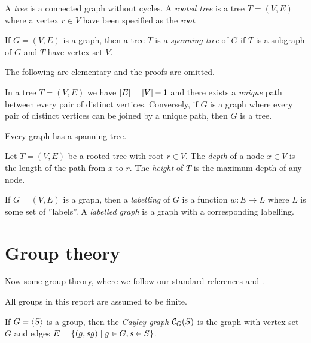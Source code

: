 \begin{deff} \label{def_tree}
A \emph{tree} is a connected graph without cycles. A \emph{rooted tree} is a tree $T = (V, E)$ where a vertex $r \in V$ have been specified as the \emph{root}.
\end{deff}

\begin{deff}
If $G = (V, E)$ is a graph, then a tree $T$ is a \emph{spanning tree} of $G$ if $T$ is a subgraph of $G$ and $T$ have vertex set $V$.
\end{deff}

The following are elementary and the proofs are omitted.
\begin{pr}
In a tree $T = (V, E)$ we have $\left\lvert E \right\rvert = \left\lvert V \right\rvert - 1$ and there
exists a \emph{unique} path between every pair of distinct
vertices. Conversely, if $G$ is a graph where every pair of distinct
vertices can be joined by a unique path, then $G$ is a tree.
\end{pr}

\begin{pr}
Every graph has a spanning tree.
\end{pr}

\begin{deff} 
Let $T = (V, E)$ be a rooted tree with root $r \in V$. The \emph{depth} of a node $x \in V$ is the length of the path from $x$ to $r$. The \emph{height} of $T$ is the maximum depth of any node.
\end{deff}

\begin{deff}
If $G = (V, E)$ is a graph, then a \emph{labelling} of $G$ is a function $w : E \to L$ where $L$ is some set of ''labels''. A \emph{labelled graph} is a graph with a corresponding labelling.
\end{deff}

\section{Group theory}
Now some group theory, where we follow our standard references \cite{bb96} and \cite{rose78}.
\begin{note}
All groups in this report are assumed to be finite.
\end{note}

\begin{deff} \label{def_cayley}
If $G = \left\langle S \right\rangle$ is a group, then the \emph{Cayley graph} $\mathcal{C}_G(S)$ is the graph with vertex set $G$ and edges $E = \left\lbrace  (g, sg) \mid g \in G, s \in S \right\rbrace$.
\end{deff}

